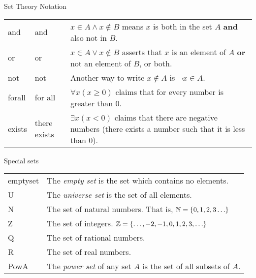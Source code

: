 \documentclass[12pt]{article}
\begin{document}
\begin{defbox}{Set Theory Notation}
\begin{tabular}{p{.65in} p{1.35in} p{3.1in}}
    \gls{and} & and & $x \in A \wedge x \notin B$ means $x$ is both in the set $A$ \textbf{and} also not in $B$. \\[1ex]
    \gls{or} & or & $x \in A \vee x \notin B$ asserts that $x$ is an element of $A$ \textbf{or} not an element of $B$, or both. \\[1ex]
    \gls{not} & not & Another way to write $x \notin A$ is $\neg x \in A$.\\[1ex]
    \gls{forall} & for all & $\forall x (x \ge 0)$ claims that for every number is greater than 0.\index{universal quantifier} \\[1ex]
    \gls{exists} & there exists\index{existential quantifier} & $\exists x (x < 0)$ claims that there are negative numbers (there exists a number such that it is less than 0). \\[1ex]
  \end{tabular}

\end{defbox}

\begin{defbox}{Special sets}

\begin{tabular}{l p{4.75in}}
  \gls{emptyset} & The \emph{empty set}\index{empty set} is the set which contains no elements.\\[1ex]
  \gls{U} & The \emph{universe set} is the set of all elements.\\[1ex]
\gls{N} & The set of natural numbers\index{natural numbers}. That is, $\mathbb N = \{0, 1, 2, 3\ldots\}$ \\[1ex]
\gls{Z} & The set of integers\index{integers}.  $\mathbb Z = \{\ldots, -2, -1, 0, 1, 2, 3, \ldots\}$\\[1ex]
\gls{Q} & The set of rational numbers\index{rationals}.\\[1ex]
\gls{R} & The set of real numbers\index{reals}.\\[1ex]
\gls{PowA} & The \emph{power set}\index{power set} of any set $A$ is the set of all subsets of $A$.
\end{tabular}
\end{defbox}
\end{document}
